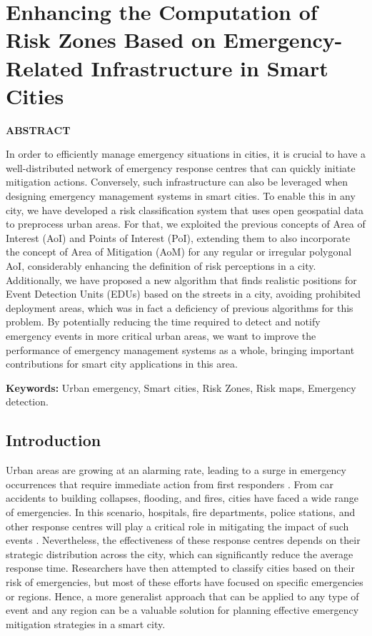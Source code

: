 \chapter{Enhancing the Computation of Risk Zones Based on Emergency-Related Infrastructure in Smart Cities}\label{cap:aom}

\begin{refsection}

\textbf{ABSTRACT}

In order to efficiently manage emergency situations in cities, it is crucial to have a well-distributed network of emergency response centres that can quickly initiate mitigation actions. Conversely, such infrastructure can also be leveraged when designing emergency management systems in smart cities. To enable this in any city, we have developed a risk classification system that uses open geospatial data to preprocess urban areas. For that, we exploited the previous concepts of Area of Interest (AoI) and Points of Interest (PoI), extending them to also incorporate the concept of Area of Mitigation (AoM) for any regular or irregular polygonal AoI, considerably enhancing the definition of risk perceptions in a city. Additionally, we have proposed a new algorithm that finds realistic positions for Event Detection Units (EDUs) based on the streets in a city, avoiding prohibited deployment areas, which was in fact a deficiency of previous algorithms for this problem. By potentially reducing the time required to detect and notify emergency events in more critical urban areas, we want to improve the performance of emergency management systems as a whole, bringing important contributions for smart city applications in this area.

\textbf{Keywords:} Urban emergency, Smart cities, Risk Zones, Risk maps, Emergency detection.

\section{Introduction}\label{sec:intro}

Urban areas are growing at an alarming rate, leading to a surge in emergency occurrences that require immediate action from first responders \cite{Costa_2022}. From car accidents to building collapses, flooding, and fires, cities have faced a wide range of emergencies. In this scenario, hospitals, fire departments, police stations, and other response centres will play a critical role in mitigating the impact of such events \cite{emergencies4,emergencies5}. Nevertheless, the effectiveness of these response centres depends on their strategic distribution across the city, which can significantly reduce the average response time. Researchers have then attempted to classify cities based on their risk of emergencies, but most of these efforts have focused on specific emergencies or regions. Hence, a more generalist approach that can be applied to any type of event and any region can be a valuable solution for planning effective emergency mitigation strategies in a smart city.


\end{refsection}

